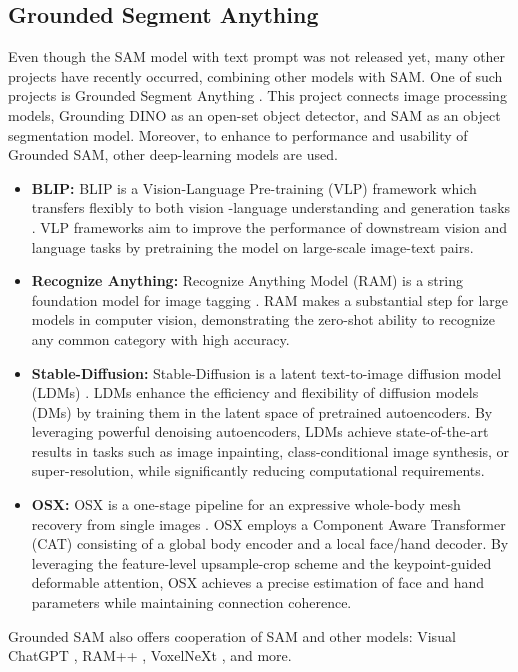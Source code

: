 \subsection{Grounded Segment Anything}
Even though the SAM model with text prompt was not released yet, many other projects have recently occurred, combining
other models with SAM. One of such projects is Grounded Segment Anything \cite{ren2024grounded}. This project connects
image processing models, Grounding DINO \cite{liu2023grounding} as an open-set object detector, and SAM \cite{SAM2023} as
an object segmentation model. Moreover, to enhance to performance and usability of Grounded SAM, other deep-learning
models are used.
\begin{itemize}
  \item \textbf{BLIP:} BLIP is a Vision-Language Pre-training (VLP) framework which transfers flexibly to both vision
  -language understanding and generation tasks \cite{li2022blip}. VLP frameworks aim to improve the performance of
  downstream vision and language tasks by pretraining the model on large-scale image-text pairs.
  \item \textbf{Recognize Anything:} Recognize Anything Model (RAM) is a string foundation model for image tagging \cite{zhang2023recognize}. RAM makes
  a substantial step for large models in computer vision,
  demonstrating the zero-shot ability to recognize any common category with high accuracy.
  \item \textbf{Stable-Diffusion:} Stable-Diffusion is a latent text-to-image diffusion model (LDMs) \cite{rombach2022highresolution}. LDMs enhance the efficiency and flexibility of diffusion models (DMs) by training
  them in the latent space of pretrained autoencoders. By leveraging powerful denoising autoencoders, LDMs achieve
  state-of-the-art results in tasks such as image inpainting, class-conditional image synthesis, or super-resolution, while significantly reducing computational requirements.
  \item \textbf{OSX:} OSX is a one-stage pipeline for an expressive whole-body mesh recovery from single images \cite{
    OSX2023}. OSX employs a Component Aware Transformer (CAT) consisting of a global body encoder and a local face/hand decoder. By leveraging the feature-level upsample-crop scheme and the keypoint-guided deformable attention, OSX
  achieves a precise estimation of face and hand parameters while maintaining connection coherence.
\end{itemize}
Grounded SAM also offers cooperation of SAM and other models: Visual ChatGPT \cite{wu2023visual}, RAM++
\cite{huang2023openset}, VoxelNeXt \cite{chen2023voxelnext}, and more.
